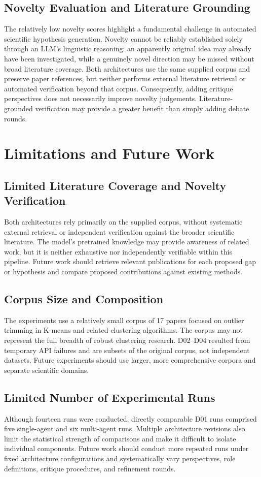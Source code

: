 \documentclass[sigconf,review,anonymous=false]{acmart}
\begin{document}
\subsection{Novelty Evaluation and Literature Grounding}
The relatively low novelty scores highlight a fundamental challenge in automated scientific hypothesis generation. Novelty cannot be reliably established solely through an LLM's linguistic reasoning: an apparently original idea may already have been investigated, while a genuinely novel direction may be missed without broad literature coverage. Both architectures use the same supplied corpus and preserve paper references, but neither performs external literature retrieval or automated verification beyond that corpus. Consequently, adding critique perspectives does not necessarily improve novelty judgements. Literature-grounded verification may provide a greater benefit than simply adding debate rounds.

\section{Limitations and Future Work}
\subsection{Limited Literature Coverage and Novelty Verification}
Both architectures rely primarily on the supplied corpus, without systematic external retrieval or independent verification against the broader scientific literature. The model's pretrained knowledge may provide awareness of related work, but it is neither exhaustive nor independently verifiable within this pipeline. Future work should retrieve relevant publications for each proposed gap or hypothesis and compare proposed contributions against existing methods.

\subsection{Corpus Size and Composition}
The experiments use a relatively small corpus of 17 papers focused on outlier trimming in K-means and related clustering algorithms. The corpus may not represent the full breadth of robust clustering research. D02--D04 resulted from temporary API failures and are subsets of the original corpus, not independent datasets. Future experiments should use larger, more comprehensive corpora and separate scientific domains.

\subsection{Limited Number of Experimental Runs}
Although fourteen runs were conducted, directly comparable D01 runs comprised five single-agent and six multi-agent runs. Multiple architecture revisions also limit the statistical strength of comparisons and make it difficult to isolate individual components. Future work should conduct more repeated runs under fixed architecture configurations and systematically vary perspectives, role definitions, critique procedures, and refinement rounds.
\end{document}
